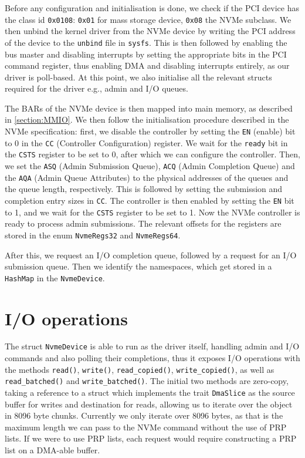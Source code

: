 Before any configuration and initialisation is done, we check if the PCI device has the class id \texttt{0x0108}: \texttt{0x01} for mass storage device, \texttt{0x08} the NVMe subclass.
We then unbind the kernel driver from the NVMe device by writing the PCI address of the device to the \texttt{unbind} file in \texttt{sysfs}. This is then followed by enabling the bus master and disabling interrupts by setting the appropriate bits in the PCI command register, thus enabling DMA and disabling interrupts entirely, as our driver is poll-based. At this point, we also initialise all the relevant structs required for the driver e.g., admin and I/O queues.

The BARs of the NVMe device is then mapped into main memory, as described in \autoref{section:MMIO}. We then follow the initialisation procedure described in the NVMe specification: first, we disable the controller by setting the \texttt{EN} (enable) bit to 0 in the \texttt{CC} (Controller Configuration) register. We wait for the \texttt{ready} bit in the \texttt{CSTS} register to be set to 0, after which we can configure the controller. Then, we set the \texttt{ASQ} (Admin Submission Queue), \texttt{ACQ} (Admin Completion Queue) and the \texttt{AQA} (Admin Queue Attributes) to the physical addresses of the queues and the queue length, respectively. This is followed by setting the submission and completion entry sizes in \texttt{CC}. The controller is then enabled by setting the \texttt{EN} bit to 1, and we wait for the \texttt{CSTS} register to be set to 1. Now the NVMe controller is ready to process admin submissions. The relevant offsets for the registers are stored in the enum \texttt{NvmeRegs32} and \texttt{NvmeRegs64}.

After this, we request an I/O completion queue, followed by a request for an I/O submission queue. Then we identify the namespaces, which get stored in a \texttt{HashMap} in the \texttt{NvmeDevice}.

\section{I/O operations}\label{subsection:io}
The struct \texttt{NvmeDevice} is able to run as the driver itself, handling admin and I/O commands and also polling their completions, thus it exposes I/O operations with the methods \texttt{read()}, \texttt{write()},  \texttt{read\_copied()}, \texttt{write\_copied()}, as well as \texttt{read\_batched()} and \texttt{write\_batched()}. The initial two methods are zero-copy, taking a reference to a struct which implements the trait \texttt{DmaSlice} as the source buffer for writes and destination for reads, allowing us to iterate over the object in 8096 byte chunks. Currently we only iterate over 8096 bytes, as that is the maximum length we can pass to the NVMe command without the use of PRP lists. If we were to use PRP lists, each request would require constructing a PRP list on a DMA-able buffer.

